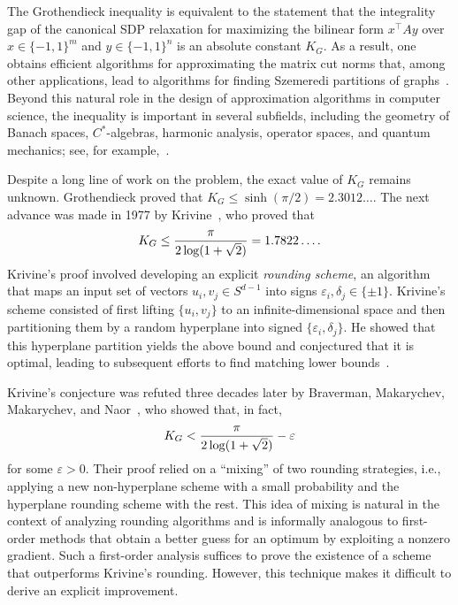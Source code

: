\documentclass[11pt]{article}
\newcommand{\1}{\mathbf 1}
\newcommand{\KG}{K_G}
\newcommand{\eps}{\varepsilon}
\theoremstyle{plain}
\theoremstyle{definition}
\theoremstyle{remark}
\begin{document}
The Grothendieck inequality is equivalent to the statement that the integrality gap of the canonical SDP relaxation for maximizing the bilinear form $x^\top Ay$ over $x\in\{-1,1\}^m$ and $y\in\{-1,1\}^n$ is an absolute constant $\KG$. As a result, one obtains efficient algorithms for approximating the matrix cut norms that, among other applications, lead to algorithms for finding Szemeredi partitions of graphs~\cite{AlonNaor2006}. Beyond this natural role in the design of approximation algorithms in computer science, the inequality is important in several subfields, including the geometry of Banach spaces, $C^*$-algebras, harmonic analysis, operator spaces, and quantum mechanics; see, for example,~\cite{LindenstraussTzafriri2013,Pisier2012,KhotNaor2011}.

Despite a long line of work on the problem, the exact value of $\KG$ remains unknown. Grothendieck proved that $\KG\le \sinh(\pi/2)=2.3012\ldots$. The next advance was made in 1977 by Krivine~\cite{Krivine1977}, who proved that
\begin{equation}\label{eq:krivine-bound-intro}
  \KG\le {\pi\over 2\log(1+\sqrt2)}=1.7822\ldots .
\end{equation}
Krivine's proof involved developing an explicit \emph{rounding scheme}, an algorithm that maps an input set of vectors $u_i,v_j\in S^{d-1}$ into signs $\eps_i,\delta_j\in\{\pm1\}$. Krivine's scheme consisted of first lifting $\{u_i,v_j\}$ to an infinite-dimensional space and then partitioning them by a random hyperplane into signed $\{\eps_i,\delta_j\}$. He showed that this hyperplane partition yields the above bound and conjectured that it is optimal, leading to subsequent efforts to find matching lower bounds~\cite{Davie1984,Reeds1991}.

Krivine's conjecture was refuted three decades later by Braverman, Makarychev, Makarychev, and Naor~\cite{BMMN2011}, who showed that, in fact,
\[
  \KG < {\pi\over 2\log(1+\sqrt2)}-\eps
\]
for some $\eps>0$. Their proof relied on a ``mixing'' of two rounding strategies, i.e., applying a new non-hyperplane scheme with a small probability and the hyperplane rounding scheme with the rest. This idea of mixing is natural in the context of analyzing rounding algorithms and is informally analogous to first-order methods that obtain a better guess for an optimum by exploiting a nonzero gradient. Such a first-order analysis suffices to prove the existence of a scheme that outperforms Krivine's rounding. However, this technique makes it difficult to derive an explicit improvement.
\end{document}
